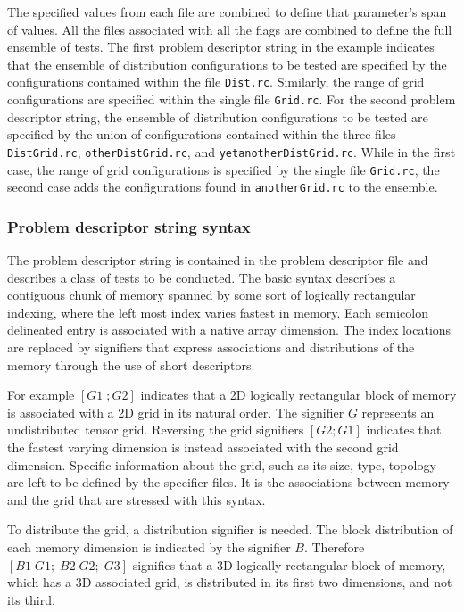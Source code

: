 The specified values from each file are combined to define that parameter's span of values.  
All the files associated with all the flags are combined to define the full ensemble of tests. 
The first problem descriptor string in the example indicates that the ensemble of distribution 
configurations to be tested are specified by the configurations contained within the file \texttt{Dist.rc}. 
Similarly, the range of grid configurations are specified within the single file \texttt{Grid.rc}. 
For the second problem descriptor string, the ensemble of distribution configurations 
to be tested are specified by the union of configurations contained within the 
three files \texttt{DistGrid.rc}, \texttt{otherDistGrid.rc}, and \texttt{yetanotherDistGrid.rc}. 
While in the first case, the range of grid configurations is specified by the single 
file \texttt{Grid.rc}, the second case adds the configurations found in \texttt{anotherGrid.rc} to the ensemble.


\subsubsection{Problem descriptor string syntax}
The problem descriptor string is contained in the problem descriptor file and describes a 
class of tests to be conducted. 
The basic syntax describes a contiguous chunk of memory spanned by some sort of logically 
rectangular indexing, where the left most index varies fastest in memory. 
Each semicolon delineated entry is associated with a native array dimension. 
The index locations are replaced by signifiers that express associations and distributions 
of the memory through the use of short descriptors. 

For example $[ G1 \; ; G2 ]$ indicates that a 2D logically rectangular block of memory 
is associated with a 2D grid in its natural order. 
The signifier $G$ represents an undistributed tensor grid. 
Reversing the grid signifiers $[ G2; G1 ]$ indicates that the fastest varying dimension 
is instead associated with the second grid dimension. 
Specific information about the grid, such as its size, type, topology are left to be defined 
by the specifier files. It is the associations between memory and the grid that are stressed with this syntax.

To distribute the grid, a distribution signifier is needed. 
The block distribution of each memory dimension is indicated by the signifier $B$. 
Therefore $[B1 \; G1; \; B2 \; G2; \; G3]$ signifies that a 3D logically rectangular block of memory, 
which has a 3D associated grid, is distributed in its first two dimensions, and not its third.

